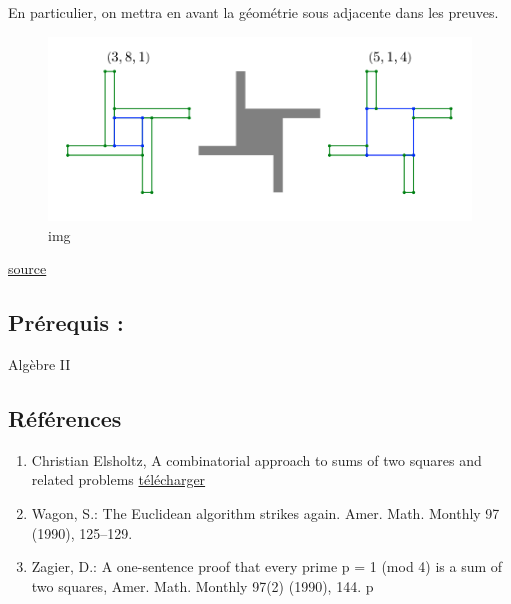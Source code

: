 \documentclass[]{article}
\begin{document}
En particulier, on mettra en avant la géométrie sous adjacente dans les
preuves.

\begin{figure}
\centering
\includegraphics{./windmills.png}
\caption{img}
\end{figure}

\href{https://mathoverflow.net/questions/31113/zagiers-one-sentence-proof-of-a-theorem-of-fermat}{source}

\subsection{Prérequis :}\label{pruxe9requis}

Algèbre II

\subsection{Références}\label{ruxe9fuxe9rences}

\begin{enumerate}
\def\labelenumi{\arabic{enumi}.}
\item
  Christian Elsholtz, A combinatorial approach to sums of two squares
  and related problems
  \href{https://www.math.tugraz.at/~elsholtz/WWW/papers/papers30nathanson-new-address3.pdf}{télécharger}
\item
  Wagon, S.: The Euclidean algorithm strikes again. Amer. Math. Monthly
  97 (1990), 125--129.
\item
  Zagier, D.: A one-sentence proof that every prime p = 1 (mod 4) is a
  sum of two squares, Amer. Math. Monthly 97(2) (1990), 144. p
\end{enumerate}
\end{document}

